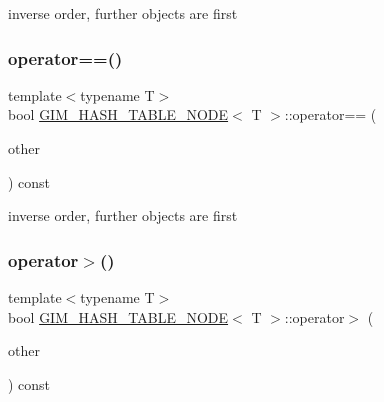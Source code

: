 inverse order, further objects are first \mbox{\label{structGIM__HASH__TABLE__NODE_a94b797f611495d4e7661e7d188f61e38}} 
\subsubsection{\texorpdfstring{operator==()}{operator==()}\hspace{0.1cm}{\footnotesize\ttfamily [2/2]}}
{\footnotesize\ttfamily template$<$typename T$>$ \\
bool \hyperlink{structGIM__HASH__TABLE__NODE}{G\+I\+M\+\_\+\+H\+A\+S\+H\+\_\+\+T\+A\+B\+L\+E\+\_\+\+N\+O\+DE}$<$ T $>$\+::operator== (\begin{DoxyParamCaption}\item[{const \hyperlink{structGIM__HASH__TABLE__NODE}{G\+I\+M\+\_\+\+H\+A\+S\+H\+\_\+\+T\+A\+B\+L\+E\+\_\+\+N\+O\+DE}$<$ T $>$ \&}]{other }\end{DoxyParamCaption}) const\hspace{0.3cm}{\ttfamily [inline]}}

inverse order, further objects are first \mbox{\label{structGIM__HASH__TABLE__NODE_acf7640e2bb9d45004154a4647eb4ef46}} 
\subsubsection{\texorpdfstring{operator$>$()}{operator>()}\hspace{0.1cm}{\footnotesize\ttfamily [1/2]}}
{\footnotesize\ttfamily template$<$typename T$>$ \\
bool \hyperlink{structGIM__HASH__TABLE__NODE}{G\+I\+M\+\_\+\+H\+A\+S\+H\+\_\+\+T\+A\+B\+L\+E\+\_\+\+N\+O\+DE}$<$ T $>$\+::operator$>$ (\begin{DoxyParamCaption}\item[{const \hyperlink{structGIM__HASH__TABLE__NODE}{G\+I\+M\+\_\+\+H\+A\+S\+H\+\_\+\+T\+A\+B\+L\+E\+\_\+\+N\+O\+DE}$<$ T $>$ \&}]{other }\end{DoxyParamCaption}) const\hspace{0.3cm}{\ttfamily [inline]}}

